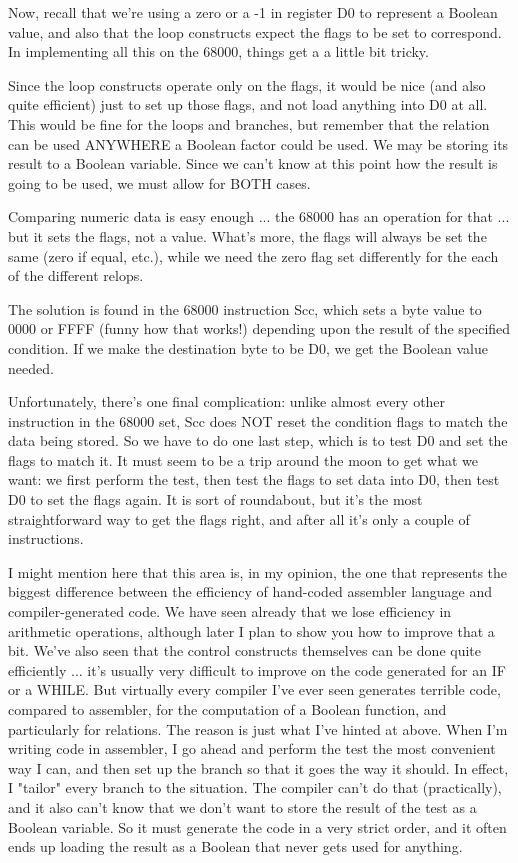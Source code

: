 \documentclass[float=false, crop=false]{standalone}
\begin{document}
Now, recall that we're using a zero or a -1 in register D0 to represent a
Boolean value, and also that the loop constructs expect the flags to be set to
correspond. In implementing all this on the 68000, things get a a little bit
tricky.

Since the loop constructs operate only on the flags, it would be nice (and also
quite efficient) just to set up those flags, and not load anything into D0 at
all. This would be fine for the loops and branches, but remember that the
relation can be used ANYWHERE a Boolean factor could be used. We may be storing
its result to a Boolean variable. Since we can't know at this point how the
result is going to be used, we must allow for BOTH cases.

Comparing numeric data is easy enough ... the 68000 has an operation for that
... but it sets the flags, not a value. What's more, the flags will always be
set the same (zero if equal, etc.), while we need the zero flag set differently
for the each of the different relops.

The solution is found in the 68000 instruction Scc, which sets a byte value to
0000 or FFFF (funny how that works!) depending upon the result of the specified
condition. If we make the destination byte to be D0, we get the Boolean value
needed.

Unfortunately, there's one final complication: unlike almost every other
instruction in the 68000 set, Scc does NOT reset the condition flags to match
the data being stored. So we have to do one last step, which is to test D0 and
set the flags to match it. It must seem to be a trip around the moon to get what
we want: we first perform the test, then test the flags to set data into D0,
then test D0 to set the flags again. It is sort of roundabout, but it's the most
straightforward way to get the flags right, and after all it's only a couple of
instructions.

I might mention here that this area is, in my opinion, the one that represents
the biggest difference between the efficiency of hand-coded assembler language
and compiler-generated code. We have seen already that we lose efficiency in
arithmetic operations, although later I plan to show you how to improve that a
bit. We've also seen that the control constructs themselves can be done quite
efficiently ... it's usually very difficult to improve on the code generated for
an IF or a WHILE. But virtually every compiler I've ever seen generates terrible
code, compared to assembler, for the computation of a Boolean function, and
particularly for relations. The reason is just what I've hinted at above. When
I'm writing code in assembler, I go ahead and perform the test the most
convenient way I can, and then set up the branch so that it goes the way it
should. In effect, I "tailor" every branch to the situation. The compiler can't
do that (practically), and it also can't know that we don't want to store the
result of the test as a Boolean variable. So it must generate the code in a very
strict order, and it often ends up loading the result as a Boolean that never
gets used for anything.
\end{document}
